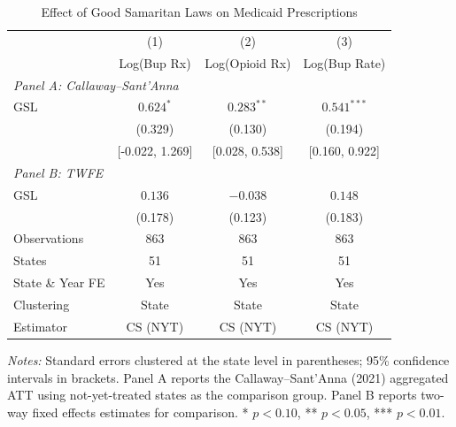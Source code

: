 \begin{table}[H]
\centering
\caption{Effect of Good Samaritan Laws on Medicaid Prescriptions}
\begin{threeparttable}
\begin{tabular}{lccc}
\toprule
 & (1) & (2) & (3) \\
 & Log(Bup Rx) & Log(Opioid Rx) & Log(Bup Rate) \\
\midrule
\multicolumn{4}{l}{\textit{Panel A: Callaway--Sant'Anna}} \\
GSL & $0.624^{*}$ & $0.283^{**}$ & $0.541^{***}$ \\
 & (0.329) & (0.130) & (0.194) \\
 & [-0.022, 1.269] & [0.028, 0.538] & [0.160, 0.922] \\
\midrule
\multicolumn{4}{l}{\textit{Panel B: TWFE}} \\
GSL & $0.136$ & $-0.038$ & $0.148$ \\
 & (0.178) & (0.123) & (0.183) \\
\midrule
Observations & 863 & 863 & 863 \\
States & 51 & 51 & 51 \\
State \& Year FE & Yes & Yes & Yes \\
Clustering & State & State & State \\
Estimator & CS (NYT) & CS (NYT) & CS (NYT) \\
\bottomrule
\end{tabular}
\begin{tablenotes}[flushleft]
\small
\item \textit{Notes:} Standard errors clustered at the state level in parentheses; 95\% confidence intervals in brackets. Panel A reports the Callaway--Sant'Anna (2021) aggregated ATT using not-yet-treated states as the comparison group. Panel B reports two-way fixed effects estimates for comparison. * $p<0.10$, ** $p<0.05$, *** $p<0.01$.
\end{tablenotes}
\end{threeparttable}
\label{tab:main}
\end{table}


